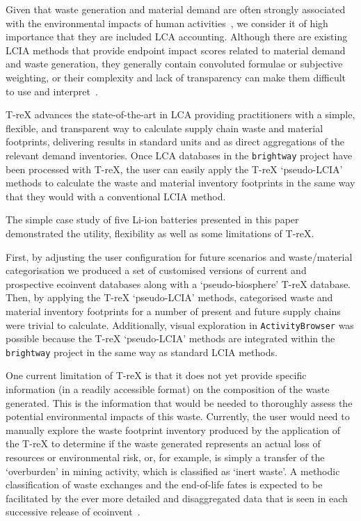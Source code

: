 Given that waste generation and material demand are often strongly associated with the environmental impacts of human activities~\citep{laurenti2023wastefootprint,steinmann2017resourcefootprints}, we consider it of high importance that they are included LCA accounting. Although there are existing LCIA methods that provide endpoint impact scores related to material demand and waste generation, they generally contain convoluted formulae or subjective weighting, or their complexity and lack of transparency can make them difficult to use and interpret~\citep{foen2021ecofactors,hauschild2003edip,cen2019en15804, arvidsson2020csi,foen2021ecofactors}.

T-reX advances the state-of-the-art in LCA providing practitioners with a simple, flexible, and transparent way to calculate supply chain waste and material footprints, delivering results in standard units and as direct aggregations of the relevant demand inventories. Once LCA databases in the \texttt{brightway} project have been processed with T-reX, the user can easily apply the T-reX `pseudo-LCIA' methods to calculate the waste and material inventory footprints in the same way that they would with a conventional LCIA method.

The simple case study of five Li-ion batteries presented in this paper demonstrated the  utility, flexibility as well as some limitations of T-reX.

First, by adjusting the user configuration for future scenarios and waste/material categorisation we produced a set of customised versions of current and prospective ecoinvent databases along with a `pseudo-biosphere' T-reX database. Then, by applying the T-reX `pseudo-LCIA' methods, categorised waste and material inventory footprints for a number of present and future supply chains were trivial to calculate. Additionally, visual exploration in \texttt{ActivityBrowser} was possible because the T-reX `pseudo-LCIA' methods are integrated within the \texttt{brightway} project in the same way as standard LCIA methods.

One current limitation of T-reX is that it does not yet provide specific information (in a readily accessible format) on the composition of the waste generated. This is the information that would be needed to thoroughly assess the potential environmental impacts of this waste. Currently, the user would need to manually explore the waste footprint inventory produced by the application of the T-reX to determine if the waste generated represents an actual loss of resources or environmental risk, or, for example, is simply a transfer of the `overburden' in mining activity, which is classified as `inert waste'. A methodic classification of waste exchanges and the end-of-life fates is expected to be facilitated by the ever more detailed and disaggregated data that is seen in each successive release of ecoinvent~\citep{fitzgerald2023ecoinventdocumentation}.

